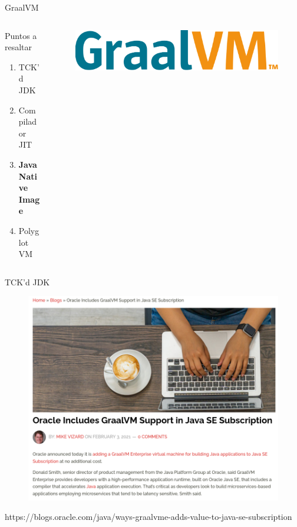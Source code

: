 \documentclass[aspectratio=169]{beamer}
\begin{document}
\begin{frame}{GraalVM}
	
	\begin{columns}[T] %
		
		\begin{column}[T]{4cm} %
			Puntos a resaltar
		\begin{enumerate}
			\item TCK'd JDK
			\item Compilador JIT
			\item \textbf{Java Native Image}
			\item Polyglot VM
		\end{enumerate}
		\end{column}
		\begin{column}[T]{6cm} %
			\begin{figure}
				\centering
				\includegraphics[width=\linewidth]{Images/graalvmlogo}

			\end{figure}
			
		\end{column}
	\end{columns}
	

\end{frame}


\begin{frame}{TCK'd JDK}

	\begin{figure}
		\centering
		\includegraphics[width=0.55\linewidth]{Images/tckjdk}
	\end{figure}
{\tiny 
https://blogs.oracle.com/java/ways-graalvme-adds-value-to-java-se-subscription
}
\end{frame}
\end{document}
